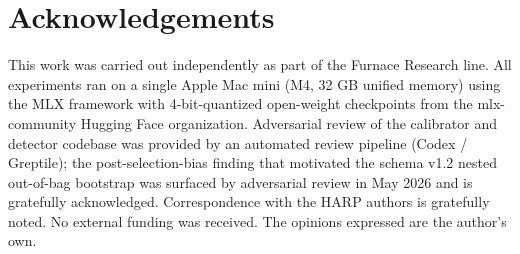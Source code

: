 \documentclass[10pt, letterpaper]{article}
\begin{document}
\section*{Acknowledgements}

This work was carried out independently as part of the Furnace
Research line. All experiments ran on a single Apple Mac mini (M4,
32 GB unified memory) using the MLX framework
\citep{mlxframework} with 4-bit-quantized open-weight checkpoints
from the mlx-community Hugging Face organization. Adversarial review
of the calibrator and detector codebase was provided by an automated
review pipeline (Codex / Greptile); the post-selection-bias finding
that motivated the schema v1.2 nested out-of-bag bootstrap was
surfaced by adversarial review in May 2026 and is gratefully
acknowledged. Correspondence with the HARP authors
\citep{hu2025harp} is gratefully noted. No external funding was
received. The opinions expressed are the author's own.
\end{document}
